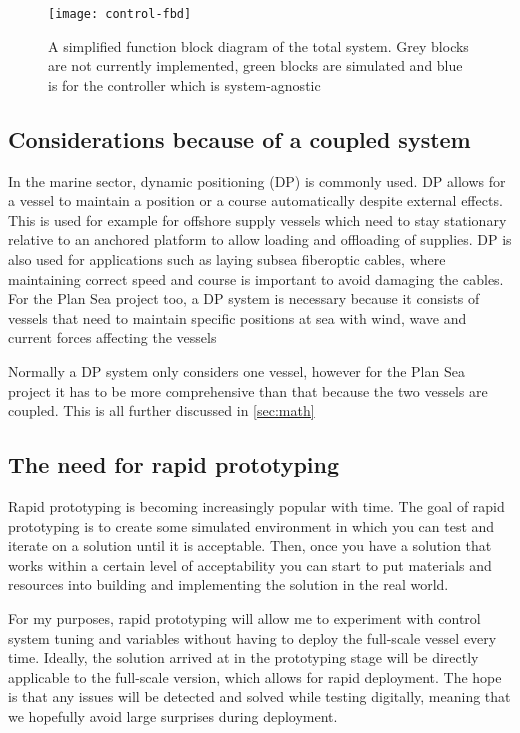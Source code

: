 \begin{figure}
	\centering
	\texttt{[image: control-fbd]}
	\caption{A simplified function block diagram of the total system. Grey blocks are not currently implemented, green blocks are simulated and blue is for the controller which is system-agnostic}
	\label{fig:fbd}
\end{figure}


\subsection{Considerations because of a coupled system}
In the marine sector, dynamic positioning (DP) is commonly used. DP allows for a vessel to maintain a position or a course automatically despite external effects. This is used for example for offshore supply vessels which need to stay stationary relative to an anchored platform to allow loading and offloading of supplies. DP is also used for applications such as laying subsea fiberoptic cables, where maintaining correct speed and course is important to avoid damaging the cables. For the Plan Sea project too, a DP system is necessary because it consists of vessels that need to maintain specific positions at sea with wind, wave and current forces affecting the vessels

Normally a DP system only considers one vessel, however for the Plan Sea project it has to be more comprehensive than that because the two vessels are coupled. This is all further discussed in \cref{sec:math}

\subsection{The need for rapid prototyping}
Rapid prototyping is becoming increasingly popular with time. The goal of rapid prototyping is to create some simulated environment in which you can test and iterate on a solution until it is acceptable. Then, once you have a solution that works within a certain level of acceptability you can start to put materials and resources into building and implementing the solution in the real world. 

For my purposes, rapid prototyping will allow me to experiment with control system tuning and variables without having to deploy the full-scale vessel every time. Ideally, the solution arrived at in the prototyping stage will be directly applicable to the full-scale version, which allows for rapid deployment. The hope is that any issues will be detected and solved while testing digitally, meaning that we hopefully avoid large surprises during deployment. 


